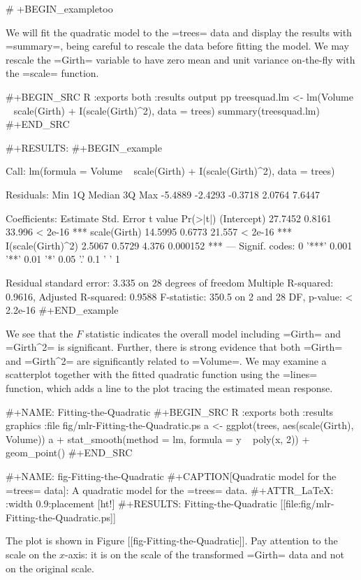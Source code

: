 # +BEGIN_exampletoo

We will fit the quadratic model to the =trees= data and display the
results with =summary=, being careful to rescale the data before
fitting the model. We may rescale the =Girth= variable to have zero
mean and unit variance on-the-fly with the =scale= function.

#+BEGIN_SRC R :exports both :results output pp 
treesquad.lm <- lm(Volume ~ scale(Girth) + I(scale(Girth)^2), data = trees)
summary(treesquad.lm)
#+END_SRC

#+RESULTS:
#+BEGIN_example

Call:
lm(formula = Volume ~ scale(Girth) + I(scale(Girth)^2), data = trees)

Residuals:
    Min      1Q  Median      3Q     Max 
-5.4889 -2.4293 -0.3718  2.0764  7.6447 

Coefficients:
                  Estimate Std. Error t value Pr(>|t|)    
(Intercept)        27.7452     0.8161  33.996  < 2e-16 ***
scale(Girth)       14.5995     0.6773  21.557  < 2e-16 ***
I(scale(Girth)^2)   2.5067     0.5729   4.376 0.000152 ***
---
Signif. codes:  0 '***' 0.001 '**' 0.01 '*' 0.05 '.' 0.1 ' ' 1

Residual standard error: 3.335 on 28 degrees of freedom
Multiple R-squared:  0.9616,	Adjusted R-squared:  0.9588 
F-statistic: 350.5 on 2 and 28 DF,  p-value: < 2.2e-16
#+END_example

We see that the \(F\) statistic indicates the overall model including
=Girth= and =Girth^2= is significant. Further, there is strong
evidence that both =Girth= and =Girth^2= are significantly related to
=Volume=. We may examine a scatterplot together with the fitted
quadratic function using the =lines= function, which adds a line to
the plot tracing the estimated mean response.

#+NAME: Fitting-the-Quadratic
#+BEGIN_SRC R :exports both :results graphics :file fig/mlr-Fitting-the-Quadratic.ps
a <- ggplot(trees, aes(scale(Girth), Volume))
a + stat_smooth(method = lm, formula = y ~ poly(x, 2)) + geom_point()
#+END_SRC

#+NAME: fig-Fitting-the-Quadratic
#+CAPTION[Quadratic model for the =trees= data]: \small A quadratic model for the =trees= data.
#+ATTR_LaTeX: :width 0.9\textwidth :placement [ht!]
#+RESULTS: Fitting-the-Quadratic
[[file:fig/mlr-Fitting-the-Quadratic.ps]]

The plot is shown in Figure [[fig-Fitting-the-Quadratic]]. Pay attention to
the scale on the \(x\)-axis: it is on the scale of the transformed
=Girth= data and not on the original scale.

